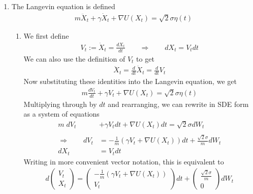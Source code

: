 \documentclass[12pt]{article}
\theoremstyle{plain}
\theoremstyle{definition}
\theoremstyle{remark}
\begin{document}
\begin{enumerate}
  \item %
    The Langevin equation is defined
    \begin{align*}
      m\ddot{X}_t + \gamma \dot{X}_t + \nabla U(X_t)
      = \sqrt{2}\sigma \eta(t)
    \end{align*}
    \begin{enumerate}
      \item %
        We first define
        \begin{align*}
          V_t := \dot{X}_t = \frac{dX_t}{dt}
          \qquad\Rightarrow\qquad
          dX_t = V_t dt
        \end{align*}
        We can also use the definition of $V_t$ to get
        \begin{align*}
        \ddot{X}_t = \frac{d}{dt} \dot{X}_t = \frac{d}{dt} V_t
        \end{align*}
        Now substituting these identities into the Langevin equation, we
        get
        \begin{align*}
          m \frac{dV_t}{dt} + \gamma V_t + \nabla U(X_t)
          = \sqrt{2}\sigma \eta(t)
        \end{align*}
        Multiplying through by $dt$ and rearranging, we can rewrite in
        SDE form as a system of equations
        \begin{align*}
          m \; dV_t &+ \gamma V_t dt + \nabla U(X_t) dt
          = \sqrt{2}\sigma dW_t \\\\
          \Rightarrow\qquad
          dV_t &=
          -\frac{1}{m}
          (\gamma V_t + \nabla U(X_t)) dt
          + \frac{\sqrt{2}\sigma}{m} dW_t \\
          dX_t &= V_t dt
        \end{align*}
        Writing in more convenient vector notation, this is equivalent
        to
        \begin{align}
          d
          \begin{pmatrix}
            V_t \\ X_t
          \end{pmatrix}
          =
          \begin{pmatrix}
            -\frac{1}{m} (\gamma V_t + \nabla U(X_t)) \\
            V_t
          \end{pmatrix}
          dt
          +
          \begin{pmatrix}
            \frac{\sqrt{2}\sigma}{m} \\ 0
          \end{pmatrix}
          dW_t
          \label{q4a.1}
        \end{align}


\end{enumerate}
\end{enumerate}
\end{document}
